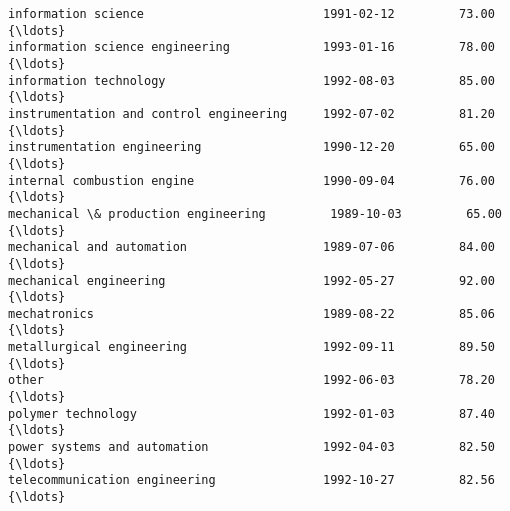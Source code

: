 \documentclass[11pt]{article}
\begin{document}
\begin{tcolorbox}[breakable, size=fbox, boxrule=.5pt, pad at break*=1mm, opacityfill=0]
\begin{Verbatim}[commandchars=\\\{\}]
information science                         1991-02-12         73.00  {\ldots}
information science engineering             1993-01-16         78.00  {\ldots}
information technology                      1992-08-03         85.00  {\ldots}
instrumentation and control engineering     1992-07-02         81.20  {\ldots}
instrumentation engineering                 1990-12-20         65.00  {\ldots}
internal combustion engine                  1990-09-04         76.00  {\ldots}
mechanical \& production engineering         1989-10-03         65.00  {\ldots}
mechanical and automation                   1989-07-06         84.00  {\ldots}
mechanical engineering                      1992-05-27         92.00  {\ldots}
mechatronics                                1989-08-22         85.06  {\ldots}
metallurgical engineering                   1992-09-11         89.50  {\ldots}
other                                       1992-06-03         78.20  {\ldots}
polymer technology                          1992-01-03         87.40  {\ldots}
power systems and automation                1992-04-03         82.50  {\ldots}
telecommunication engineering               1992-10-27         82.56  {\ldots}


\end{Verbatim}
\end{tcolorbox}
\end{document}
